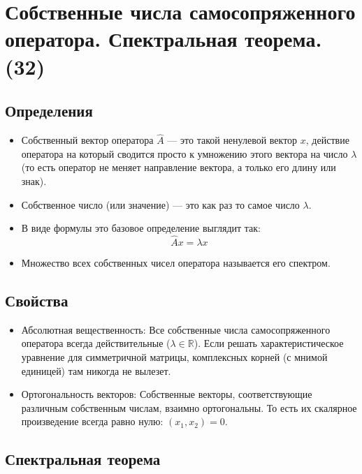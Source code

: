 \documentclass[14pt]{extreport}
\begin{document}
    \chapter{Собственные числа самосопряженного оператора. Спектральная теорема.  (32)}

    \section{Определения}

    \begin{defbox}
        \begin{itemize}
            \item Собственный вектор оператора $\hat{A}$ — это такой ненулевой вектор $x$, действие оператора на который сводится просто к умножению этого вектора на число $\lambda$ (то есть оператор не меняет направление вектора, а только его длину или знак).
            \item Собственное число (или значение) — это как раз то самое число $\lambda$.
            \item В виде формулы это базовое определение выглядит так:$$\hat{A}x = \lambda x$$
            \item Множество всех собственных чисел оператора называется его спектром.
        \end{itemize}
    \end{defbox}

    \section{Свойства}

    \begin{itemize}
        \item Абсолютная вещественность: Все собственные числа самосопряженного оператора всегда действительные ($\lambda \in \mathbb{R}$). Если решать характеристическое уравнение для симметричной матрицы, комплексных корней (с мнимой единицей) там никогда не вылезет.
        \item Ортогональность векторов: Собственные векторы, соответствующие различным собственным числам, взаимно ортогональны. То есть их скалярное произведение всегда равно нулю: $(x_1, x_2) = 0$.
    \end{itemize}

    \section{Спектральная теорема}
\end{document}
